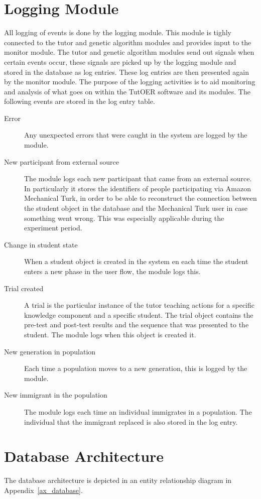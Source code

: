 \section{Logging Module}
\label{sec:software_logging_module}
All logging of events is done by the logging module. This module is tighly
connected to the tutor and genetic algorithm modules and provides input to
the monitor module. The tutor and genetic algorithm modules send out signals
when certain events occur, these signals are picked up by the logging module
and stored in the database as log entries. These log entries are then presented
again by the monitor module. The purpose of the logging activities is to aid
monitoring and analysis of what goes on within the TutOER software and its
modules. The following events are stored in the log entry table.
\begin{description}
	\item[Error] Any unexpected errors that were caught in the system are
		logged by the module.
	\item[New participant from external source] The module logs each new
		participant that came from an external source. In particularly it
		stores the identifiers of people participating via Amazon
		Mechanical Turk, in order to be able to reconstruct the connection
		between the student object in the database and the Mechanical Turk
		user in case something went wrong. This was especially applicable
		during the experiment period.
	\item[Change in student state] When a student object is created in the
		system en each time the student enters a new phase in the user
		flow, the module logs this.
	\item[Trial created] A trial is the particular instance of the tutor
		teaching actions for a specific knowledge component and a specific
		student. The trial object contains the pre-test and post-test
		results and the sequence that was presented to the student. The
		module logs when this object is created it.
	\item[New generation in population] Each time a population moves to a
		new generation, this is logged by the module.
	\item[New immigrant in the population] The module logs each time an
		individual immigrates in a population. The individual that the
		immigrant replaced is also stored in the log entry.
\end{description}
\section{Database Architecture}
\label{sec:software_database}
The database architecture is depicted in an entity relationship diagram in
Appendix~\ref{ax_database}.
